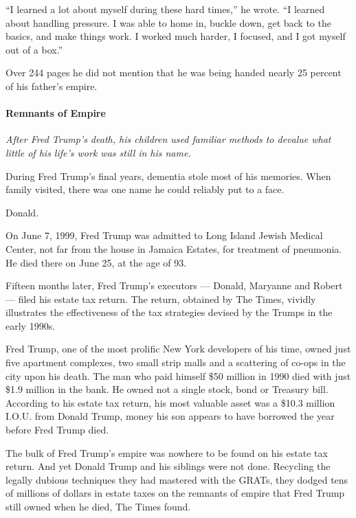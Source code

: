 ``I learned a lot about myself during these hard times,'' he wrote. ``I
learned about handling pressure. I was able to home in, buckle down, get
back to the basics, and make things work. I worked much harder, I
focused, and I got myself out of a box.''

Over 244 pages he did not mention that he was being handed nearly 25
percent of his father's empire.

\hypertarget{remnants-of-empire}{%
\paragraph{Remnants of Empire}\label{remnants-of-empire}}

\emph{After Fred Trump's death, his children used familiar methods to
devalue what little of his life's work was still} \emph{in his name.}

During Fred Trump's final years, dementia stole most of his memories.
When family visited, there was one name he could reliably put to a face.

Donald.

On June 7, 1999, Fred Trump was admitted to Long Island Jewish Medical
Center, not far from the house in Jamaica Estates, for treatment of
pneumonia. He died there on June 25, at the age of 93.

Fifteen months later, Fred Trump's executors --- Donald, Maryanne and
Robert --- filed his estate tax return. The return, obtained by The
Times, vividly illustrates the effectiveness of the tax strategies
devised by the Trumps in the early 1990s.

Fred Trump, one of the most prolific New York developers of his time,
owned just five apartment complexes, two small strip malls and a
scattering of co-ops in the city upon his death. The man who paid
himself \$50 million in 1990 died with just \$1.9 million in the bank.
He owned not a single stock, bond or Treasury bill. According to his
estate tax return, his most valuable asset was a \$10.3 million I.O.U.
from Donald Trump, money his son appears to have borrowed the year
before Fred Trump died.

The bulk of Fred Trump's empire was nowhere to be found on his estate
tax return. And yet Donald Trump and his siblings were not done.
Recycling the legally dubious techniques they had mastered with the
GRATs, they dodged tens of millions of dollars in estate taxes on the
remnants of empire that Fred Trump still owned when he died, The Times
found.

